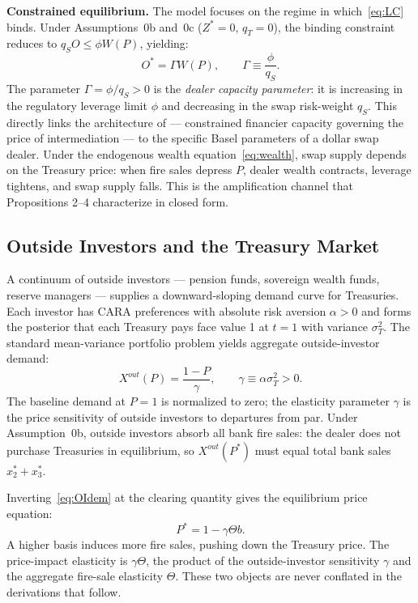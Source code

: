 \textbf{Constrained equilibrium.} The model focuses on the regime in which~\eqref{eq:LC} binds.
Under Assumptions~0b and~0c ($Z^* = 0$, $q_T = 0$), the binding constraint reduces to
$q_S O \leq \phi W(P)$, yielding:
\begin{equation}
  O^* = \Gamma W(P), \qquad \Gamma \equiv \frac{\phi}{q_S}.
  \tag{O-star}
  \label{eq:Ostar}
\end{equation}
The parameter $\Gamma = \phi/q_S > 0$ is the \textit{dealer capacity parameter}: it is increasing
in the regulatory leverage limit $\phi$ and decreasing in the swap risk-weight $q_S$. This
directly links the architecture of \citet{GabaixMaggori2015} — constrained financier capacity
governing the price of intermediation — to the specific Basel parameters of a dollar swap dealer.
Under the endogenous wealth equation~\eqref{eq:wealth}, swap supply depends on the Treasury price:
when fire sales depress $P$, dealer wealth contracts, leverage tightens, and swap supply falls.
This is the amplification channel that Propositions 2–4 characterize in closed form.

\subsection{Outside Investors and the Treasury Market}
\label{subsec:outsideinvestors}

A continuum of outside investors — pension funds, sovereign wealth funds, reserve managers —
supplies a downward-sloping demand curve for Treasuries. Each investor has CARA preferences with
absolute risk aversion $\alpha > 0$ and forms the posterior that each Treasury pays face value 1
at $t=1$ with variance $\sigma_T^2$. The standard mean-variance portfolio problem yields aggregate
outside-investor demand:
\begin{equation}
  X^{out}(P) = \frac{1-P}{\gamma}, \qquad \gamma \equiv \alpha\sigma_T^2 > 0.
  \tag{OI-dem}
  \label{eq:OIdem}
\end{equation}
The baseline demand at $P = 1$ is normalized to zero; the elasticity parameter $\gamma$ is
the price sensitivity of outside investors to departures from par. Under Assumption~0b, outside
investors absorb all bank fire sales: the dealer does not purchase Treasuries in equilibrium, so
$X^{out}(P^*)$ must equal total bank sales $x_2^* + x_3^*$.

Inverting~\eqref{eq:OIdem} at the clearing quantity gives the equilibrium price equation:
\begin{equation}
  P^* = 1 - \gamma\Theta b.
  \tag{P-eq}
  \label{eq:Peq}
\end{equation}
A higher basis induces more fire sales, pushing down the Treasury price. The price-impact
elasticity is $\gamma\Theta$, the product of the outside-investor sensitivity $\gamma$ and the
aggregate fire-sale elasticity $\Theta$. These two objects are never conflated in the derivations
that follow.

